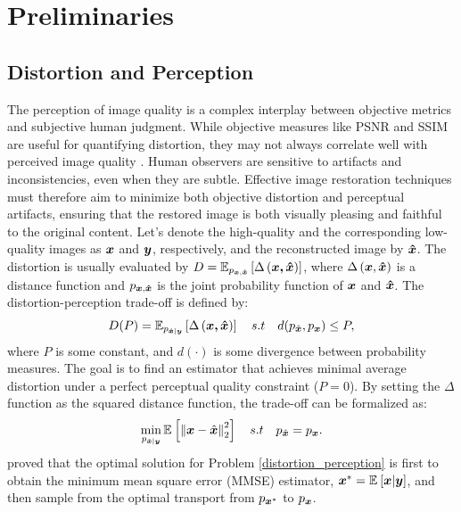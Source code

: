\section{Preliminaries}

\subsection{Distortion and Perception}
The perception of image quality is a complex interplay between objective metrics and subjective human judgment. While objective measures like PSNR and SSIM are useful for quantifying distortion, they may not always correlate well with perceived image quality \cite{wang2004image}. Human observers are sensitive to artifacts and inconsistencies, even when they are subtle. Effective image restoration techniques must therefore aim to minimize both objective distortion and perceptual artifacts, ensuring that the restored image is both visually pleasing and faithful to the original content. Let's denote the high-quality and the corresponding low-quality images as $\vectorsym{x}$ and $\vectorsym{y}$, respectively, and the reconstructed image by $\vectorsym{\hat{x}}$. The distortion is usually evaluated by
$D = \expectation{\Delta\brackets{\vectorsym{x,\vectorsym{\hat{x}}}}}{p_{\vectorsym{x},\vectorsym{\hat{x}}}}$, where $\Delta\brackets{\vectorsym{x},\vectorsym{\hat{x}}}$ is a distance function and $p_{\vectorsym{x},\vectorsym{\hat{x}}}$ is the joint probability function of $\vectorsym{x}$ and $\vectorsym{\hat{x}}$. The distortion-perception trade-off \cite{blau2018perception} is defined by:
\begin{align}
    D(P) = \expectation{\Delta\brackets{\vectorsym{x,\vectorsym{\hat{x}}}}}{p_{\vectorsym{\hat{x}}|\vectorsym{y}}} \quad  s.t \quad d(p_{\hat{\vectorsym{x}}},p_{\vectorsym{x}}) \leq P,
\end{align}
where $P$ is some constant, and $d(\cdot)$ is some divergence between
probability measures. The goal is to find an estimator that achieves minimal average distortion under a perfect perceptual quality constraint ($P=0$). By setting the $\Delta$ function as the squared distance function, the trade-off can be formalized as:
\begin{align}\label{distortion_perception}
    \min_{p_{\hat{\vectorsym{x}}|\vectorsym{y}}} \expectation{\norm{\vectorsym{x}-\hat{\vectorsym{x}}}_2^2}{}\quad s.t \quad p_{\hat{\vectorsym{x}}}=p_{\vectorsym{x}}.
\end{align}
\citet{freirich2021a} proved that the optimal solution for Problem \ref{distortion_perception} is first to obtain the minimum mean square error (MMSE) estimator, $\vectorsym{x}^{*}=\expectation{\vectorsym{x}|\vectorsym{y}}{}$, and then sample from the optimal transport from $p_{\vectorsym{x}^{*}}$ to $p_{\vectorsym{x}}$.


